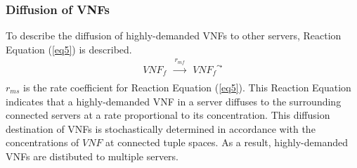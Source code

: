 \documentclass[technicalreport]{ieicej}
\begin{document}
	\subsubsection{Diffusion of VNFs}
	To describe the diffusion of highly-demanded VNFs to other servers, Reaction Equation (\ref{eq5}) is described.
	\begin{eqnarray}
	\label{eq5}
	\mathit{VNF_f}&\xrightarrow[]{\mathit{r_{mf}}}&\mathit{VNF_f}^\leadsto
	\end{eqnarray}
	$r_{ms}$ is the rate coefficient for Reaction Equation (\ref{eq5}).
	This Reaction Equation indicates that a highly-demanded VNF in a server diffuses to the surrounding connected servers at a rate proportional to its concentration.
	This diffusion destination of VNFs is stochastically determined in accordance with the concentrations of $\mathit{VNF}$ at connected tuple spaces.
	As a result, highly-demanded VNFs are distibuted to multiple servers.
\end{document}
